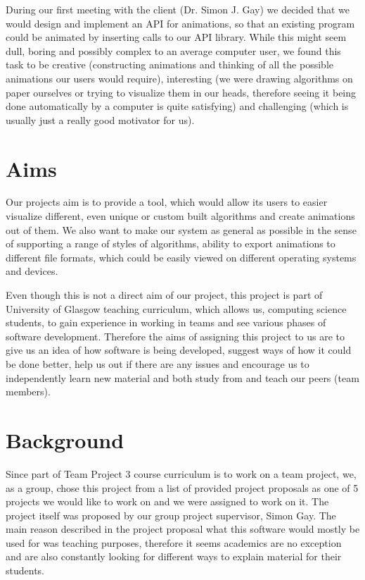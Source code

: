 \documentclass{l3proj}
\begin{document}
During our first meeting with the client (Dr. Simon J. Gay) we decided that we would design and implement an API for animations, so that an existing program could be animated by inserting calls to our API library. While this might seem dull, boring and possibly complex to an average computer user, we found this task to be creative (constructing animations and thinking of all the possible animations our users would require), interesting (we were drawing algorithms on paper ourselves or trying to visualize them in our heads, therefore seeing it being done automatically by a computer is quite satisfying) and challenging (which is usually just a really good motivator for us).
\section{Aims}
Our projects aim is to provide a tool, which would allow its users to easier visualize different, even unique or custom built algorithms and create animations out of them. We also want to make our system as general as possible in the sense of supporting a range of styles of algorithms, ability to export animations to different file formats, which could be easily viewed on different operating systems and devices.

Even though this is not a direct aim of our project, this project is part of University of Glasgow teaching curriculum, which allows us, computing science students, to gain experience in working in teams and see various phases of software development. Therefore the aims of assigning this project to us are to give us an idea of how software is being developed, suggest ways of how it could be done better, help us out if there are any issues and encourage us to independently learn new material and both study from and teach our peers (team members).

\section{Background}
Since part of Team Project 3 course curriculum is to work on a team project, we, as a group, chose this project from a list of provided project proposals as one of 5 projects we would like to work on and we were assigned to work on it. The project itself was proposed by our group project supervisor, Simon Gay. The main reason described in the project proposal what this software would mostly be used for was teaching purposes, therefore it seems academics are no exception and are also constantly looking for different ways to explain material for their students.
\end{document}
